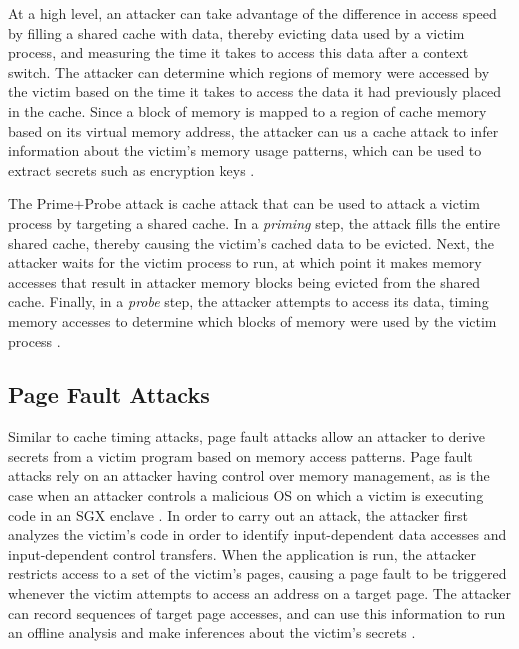 At a high level, an attacker can take advantage of the difference in access speed by filling a shared cache with data, thereby evicting data used by a victim process, and measuring the time it takes to access this data after a context switch. The attacker can determine which regions of memory were accessed by the victim based on the time it takes to access the data it had previously placed in the cache. Since a block of memory is mapped to a region of cache memory based on its virtual memory address, the attacker can us a cache attack to infer information about the victim's memory usage patterns, which can be used to extract secrets such as encryption keys \cite{moghimi_cachezoom:_2017, gotzfried_cache_2017}.

The Prime+Probe attack is cache attack that can be used to attack a victim process by targeting a shared cache. In a \emph{priming} step, the attack fills the entire shared cache, thereby causing the victim's cached data to be evicted. Next, the attacker waits for the victim process to run, at which point it makes memory accesses that result in attacker memory blocks being evicted from the shared cache. Finally, in a \emph{probe} step, the attacker attempts to access its data, timing memory accesses to determine which blocks of memory were used by the victim process \cite{moghimi_cachezoom:_2017, gotzfried_cache_2017}.

\subsection{Page Fault Attacks}

Similar to cache timing attacks, page fault attacks allow an attacker to derive secrets from a victim program based on memory access patterns. Page fault attacks rely on an attacker having control over memory management, as is the case when an attacker controls a malicious OS on which a victim is executing code in an SGX enclave \cite{intel_corporation_tutorial_2015}. In order to carry out an attack, the attacker first analyzes the victim's code in order to identify input-dependent data accesses and input-dependent control transfers. When the application is run, the attacker restricts access to a set of the victim's pages, causing a page fault to be triggered whenever the victim attempts to access an address on a target page. The attacker can record sequences of target page accesses, and can use this information to run an offline analysis and make inferences about the victim's secrets \cite{xu_controlled-channel_2015, shinde_preventing_2015}.

